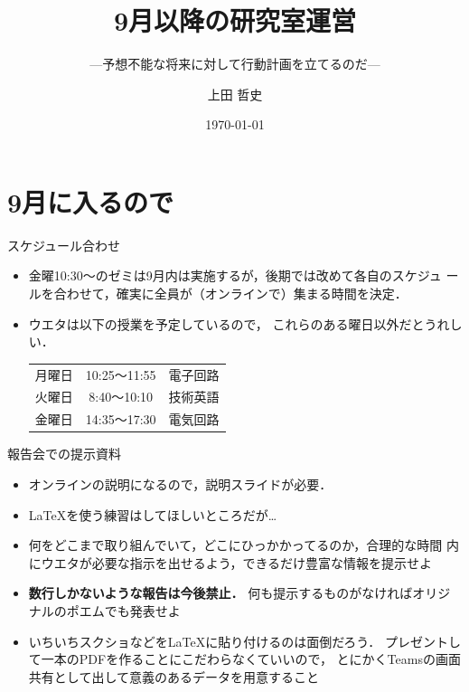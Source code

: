 \documentclass[unicode,12pt,aspectratio=169]{beamer}
\title{9月以降の研究室運営}
\subtitle{---予想不能な将来に対して行動計画を立てるのだ---}
\author[T. Ueta]{上田 哲史}
\institute{徳島大学 情報センター}
\date{\today}
\begin{document}
\begin{frame}
\maketitle
\end{frame}

\section{9月に入るので}

\begin{frame}{スケジュール合わせ}
\begin{itemize}
\item 金曜10:30〜のゼミは9月内は実施するが，後期では改めて各自のスケジュ
ールを合わせて，確実に全員が（オンラインで）集まる時間を決定．
\item ウエタは以下の授業を予定しているので，
これらのある曜日以外だとうれしい．\par

\centering
\begin{tabular}{ccc}
月曜日 & 10:25〜11:55 & 電子回路 \\
火曜日 & 8:40〜10:10 & 技術英語 \\
金曜日 & 14:35〜17:30 & 電気回路 \\
\end{tabular}
\end{itemize}
\end{frame}

\begin{frame}{報告会での提示資料}
\begin{itemize}
\item オンラインの説明になるので，説明スライドが必要．
\item \LaTeX を使う練習はしてほしいところだが…
\item 何をどこまで取り組んでいて，どこにひっかかってるのか，合理的な時間
内にウエタが必要な指示を出せるよう，できるだけ豊富な情報を提示せよ
\item \textbf{数行しかないような報告は今後禁止．}
何も提示するものがなければオリジ
ナルのポエムでも発表せよ
\item いちいちスクショなどを\LaTeX に貼り付けるのは面倒だろう．
プレゼントして一本のPDFを作ることにこだわらなくていいので，
とにかくTeamsの画面共有として出して意義のあるデータを用意すること
\end{itemize}
\end{frame}
\end{document}

